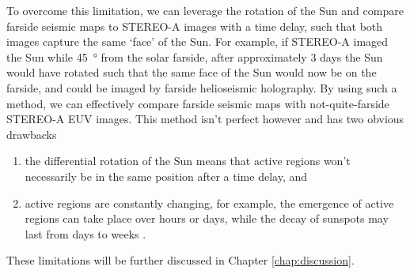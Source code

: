\documentclass[11pt,a4paper,onecolumn]{report}
\begin{document}
To overcome this limitation, we can leverage the rotation of the Sun and compare
farside seismic maps to STEREO-A images with a time delay, such that both images
capture the same `face' of the Sun. For example, if STEREO-A imaged the Sun while
\SI[]{45}[]{\degree} from the solar farside, after approximately 3 days the Sun
would have rotated such that the same face of the Sun would now be on the
farside, and could be imaged by farside helioseismic holography. By using such a
method, we can effectively compare farside seismic maps with not-quite-farside
STEREO-A EUV images. This method isn't perfect however and has two obvious drawbacks
\begin{enumerate}
  \item the differential rotation of the Sun means that active regions won't
  necessarily be in the same position after a time delay, and
  \item active regions are constantly changing, for example, the emergence of
  active regions can take place over hours or days, while the decay of
  sunspots may last from days to weeks
  \citep{van_driel-gesztelyi_evolution_2015}.
\end{enumerate}
These limitations will be further discussed in Chapter \ref{chap:discussion}. \\
\end{document}
